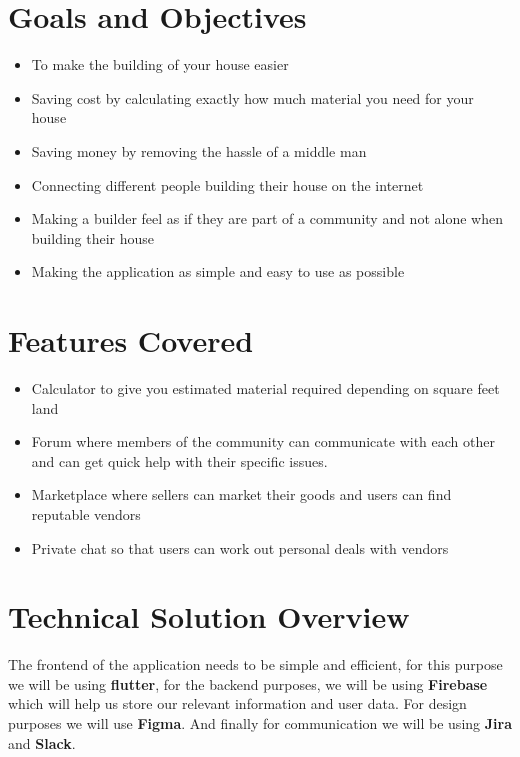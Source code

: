 \documentclass{article}
\begin{document}
\section*{Goals and Objectives}

\begin{itemize}
    \item To make the building of your house easier
    \item Saving cost by calculating exactly how much material you need for your house
    \item Saving money by removing the hassle of a middle man
    \item Connecting different people building their house on the internet
    \item Making a builder feel as if they are part of a community and not alone when
          building their house
    \item Making the application as simple and easy to use as possible
\end{itemize}

\section*{Features Covered}
\begin{itemize}
    \item Calculator to give you estimated material required depending on square feet
          land
    \item Forum where members of the community can communicate with each other and can
          get quick help with their specific issues.
    \item Marketplace where sellers can market their goods and users can find reputable
          vendors
    \item Private chat so that users can work out personal deals with vendors
\end{itemize}

\section*{Technical Solution Overview}

The frontend of the application needs to be simple and efficient, for this
purpose we will be using \textbf{flutter}, for the backend purposes, we will be
using \textbf{Firebase} which will help us store our relevant information and
user data. For design purposes we will use \textbf{Figma}. And finally for
communication we will be using \textbf{Jira} and \textbf{Slack}.
\end{document}
